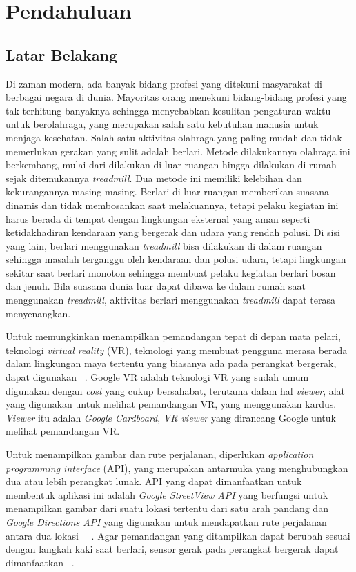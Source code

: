 \chapter{Pendahuluan}
\label{chap:intro}
   
\section{Latar Belakang}
\label{sec:label}

Di zaman modern, ada banyak bidang profesi yang ditekuni masyarakat di berbagai negara di dunia. Mayoritas orang menekuni bidang-bidang profesi yang tak terhitung banyaknya sehingga menyebabkan kesulitan pengaturan waktu untuk berolahraga, yang merupakan salah satu kebutuhan manusia untuk menjaga kesehatan. Salah satu aktivitas olahraga yang paling mudah dan tidak memerlukan gerakan yang sulit adalah berlari. Metode dilakukannya olahraga ini berkembang, mulai dari dilakukan di luar ruangan hingga dilakukan di rumah sejak ditemukannya {\it treadmill}. Dua metode ini memiliki kelebihan dan kekurangannya masing-masing. Berlari di luar ruangan memberikan suasana dinamis dan tidak membosankan saat melakuannya, tetapi pelaku kegiatan ini harus berada di tempat dengan lingkungan eksternal yang aman seperti ketidakhadiran kendaraan yang bergerak dan udara yang rendah polusi. Di sisi yang lain, berlari menggunakan \textit{treadmill} bisa dilakukan di dalam ruangan sehingga masalah terganggu oleh kendaraan dan polusi udara, tetapi lingkungan sekitar saat berlari monoton sehingga membuat pelaku kegiatan berlari bosan dan jenuh. Bila suasana dunia luar dapat dibawa ke dalam rumah saat menggunakan \textit{treadmill}, aktivitas berlari menggunakan \textit{treadmill} dapat terasa menyenangkan. 

Untuk memungkinkan menampilkan pemandangan tepat di depan mata pelari, teknologi \textit{virtual reality} (VR), teknologi yang membuat pengguna merasa berada dalam lingkungan maya tertentu yang biasanya ada pada perangkat bergerak, dapat digunakan ~\cite{quickstart-google-vr}. Google VR adalah teknologi VR yang sudah umum digunakan dengan \textit{cost} yang cukup bersahabat, terutama dalam hal \textit{viewer}, alat yang digunakan untuk melihat pemandangan VR, yang menggunakan kardus. \textit{Viewer} itu adalah \textit{Google Cardboard}, \textit{VR viewer} yang dirancang Google untuk melihat pemandangan VR.

Untuk menampilkan gambar dan rute perjalanan, diperlukan \textit{application programming interface} (API), yang merupakan antarmuka yang menghubungkan dua atau lebih perangkat lunak. API yang dapat dimanfaatkan untuk membentuk aplikasi  ini adalah \textit{Google StreetView API} yang berfungsi untuk menampilkan  gambar dari suatu lokasi tertentu dari satu arah pandang dan \textit{Google Directions API} yang digunakan untuk mendapatkan rute perjalanan antara dua lokasi ~\cite{streetview-api}~\cite{directions-api}. Agar pemandangan yang ditampilkan dapat berubah sesuai dengan langkah kaki saat berlari, sensor gerak pada perangkat bergerak dapat dimanfaatkan ~\cite{motion-sensor}. 

